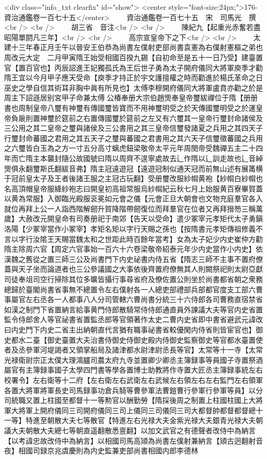 <div class="info_txt clearfix" id="show">
<center style="font-size:24px;">176-資治通鑑卷一百七十五</center>
  　　資治通鑑卷一百七十五　宋　司馬光　撰<br />
<br />
　　胡三省　音注<br />
<br />
　　陳紀九【起重光赤奮若盡昭陽單閼凡三年】<br />
<br />
　　高宗宣皇帝下之下<br />
<br />
　　太建十三年春正月壬午以晉安王伯恭為尚書左僕射吏部尚書袁憲為右僕射憲樞之弟也　周改元大定　二月甲寅隋王始受相國百揆九錫【自初命至是五十一日乃受】建臺置官【置百官也】丙辰詔進王妃獨孤氏為王后世子勇為太子開府儀同大將軍庾季才勸隋王宜以今月甲子應天受命【庾季才持正於宇文護擅權之時而勸進於楊氏革命之日巫史之學自信其術耳非胸中眞有所見也】太傅李穆開府儀同大將軍盧賁亦勸之於是周主下詔遜居别宮甲子命兼太傅公椿奉册大宗伯趙煚奉皇帝璽紱禪位于隋【册册書也周制皇帝八璽有神璽有傳國璽皆寶而不用神璽明受之於天傳國璽明受之於運皇帝負扆則置神璽於筵前之右置傳國璽於筵前之左又有六璽其一皇帝行璽封命諸侯及三公用之其二皇帝之璽與諸侯及三公書用之其三皇帝信璽發諸夏之兵用之其四天子行璽封命蕃國之君用之其五天子之璽與蕃國之君書用之其六天子信璽徵蕃國之兵用之六璽皆白玉為之方一寸五分高寸螭虎鈕梁敬帝太平元年周閔帝受魏禪五主二十四年而亡隋主本襲封隨公故國號曰隋以周齊不遑寧處故去辶作隋以辶訓走故也辶音綽煚俱永翻璽斯氏翻紱音弗】隋主冠遠遊冠【遠遊冠制似通天冠而前無山述有展筩横于冠前皇太子及王者後諸王服之主冠古玩翻】受册璽改服紗㡌黄袍【紗㡌白紗㡌也名高頂帽皇帝服絳紗袍志曰開皇初高祖常服烏紗㡌紀云秋七月上始服黄百寮畢賀蓋以黄為常服】入御臨光殿服衮冕如元會之儀【元會正旦大朝會也文物充庭羣官各入就位再拜上公一人詣西階解劒升賀降階帶劒復位而拜羣官在位者又再拜搢笏三稱萬歲】大赦改元開皇命有司奏册祀于南郊【告天以受命】遣少冢宰元孝矩代太子勇鎭洛陽【少冢宰當作小冢宰】孝矩名矩以字行天賜之孫也【按隋書元孝矩傳祖修義不言以字行汝隂王天賜當魏太和之世距此時百餘年當考】女為太子妃少内史崔仲方勸隋主除周六官【周定六官事始一百六十六卷梁敬帝紹泰元年少内史當作小内史】依漢魏之舊從之置三師三公及尚書門下内史祕書内侍五省【隋志三師不主事不置府僚蓋與天子坐而論道者也三公參議國之大事依後齊置府僚無其人則闕祭祀則太尉亞獻司徒奉俎司空行掃除其位多曠皆攝行事尋省府及僚佐置公則坐於尚書都省朝之衆務總歸於臺閣尚書省事無不總置令左右僕射各一人總吏部禮部兵部都官度支工部六曹事屬官左右丞各一人都事八人分司管轄六曹尚書分統三十六侍郎各司曹務直宿禁省如漢之制門下省置納言給事黄門侍郎散騎常侍侍郎通直員外諫議大夫等官内史省置監令侍郎舍人等官祕書省置監丞郎等官領著作太史二曹内史省即中書省避武元諱改曰内史門下内史二省主出納朝直代言猶有職事祕書省較優閑内侍省則皆宦官也】御史都水二臺【御史臺置大夫治書侍御史侍御史殿内侍御史監察御史等官都水臺置使者及丞參軍河堤謁者又領掌船局及諸津都水尉津尉丞長等官】太常等十一寺【太常光禄衛尉宗正太僕大理鴻臚司農太府九寺並置卿少卿丞主簿録事等員國子寺置祭酒屬官有主簿録事國子太學四門書等學各置博士助教將作寺置大匠丞主簿録事統左右校署令】左右衛等十二府【左右衛左右武衛左右武候左右領左右左右監門左右領軍各置大將軍將軍長史司馬録事功倉兵騎等曹參軍法曹鎧曹行參軍行參軍等員】以分司統職又置上柱國至都督十一等勲官以酬勤勞【隋採後周之制置上柱國柱國上大將軍大將軍上開府儀同三司開府儀同三司上儀同三司儀同三司大都督帥都督都督總十一等】特進至朝散大夫七等散官【特進左右光禄大夫金紫光禄大夫銀青光禄大夫朝議大夫朝散大夫總七等朝直遥翻散悉亶翻】以加文武官之有德聲者改侍中為納言【以考諱忠故改侍中為納言】以相國司馬高熲為尚書左僕射兼納言【熲古迥翻射音夜】相國司録京兆虞慶則為内史監兼吏部尚書相國内郎李德林